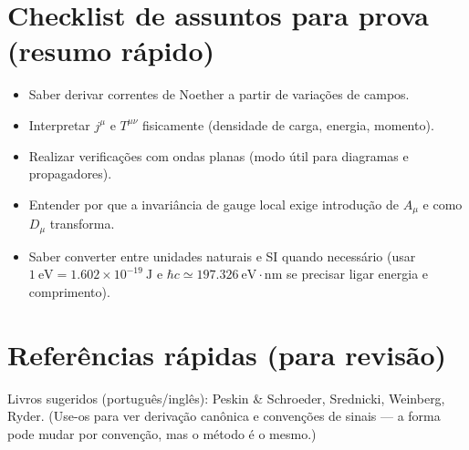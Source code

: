 \documentclass[12pt,a4paper]{article}
\begin{document}
\section{Checklist de assuntos para prova (resumo rápido)}
\begin{itemize}
  \item Saber derivar correntes de Noether a partir de variações de campos.
  \item Interpretar $j^\mu$ e $T^{\mu\nu}$ fisicamente (densidade de carga, energia, momento).
  \item Realizar verificações com ondas planas (modo útil para diagramas e propagadores).
  \item Entender por que a invariância de gauge local exige introdução de $A_\mu$ e como $D_\mu$ transforma.
  \item Saber converter entre unidades naturais e SI quando necessário (usar $1\ \mathrm{eV}=1.602\times10^{-19}\ \mathrm{J}$ e $\hbar c\simeq 197.326\ \mathrm{eV\cdot nm}$ se precisar ligar energia e comprimento).
\end{itemize}

\section{Referências rápidas (para revisão)}
Livros sugeridos (português/inglês): Peskin \& Schroeder, Srednicki, Weinberg, Ryder. (Use-os para ver derivação canônica e convenções de sinais — a forma pode mudar por convenção, mas o método é o mesmo.)
\end{document}
